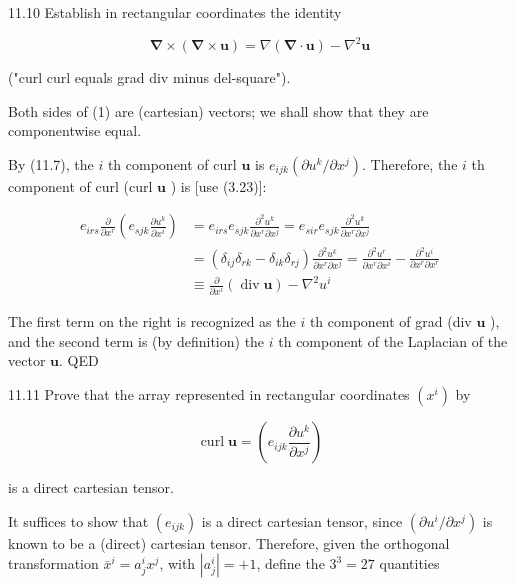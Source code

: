 \documentclass[10pt]{article}
\begin{document}
11.10 Establish in rectangular coordinates the identity


\begin{equation*}
\boldsymbol{\nabla} \times(\boldsymbol{\nabla} \times \mathbf{u})=\nabla(\boldsymbol{\nabla} \cdot \mathbf{u})-\nabla^{2} \mathbf{u} \tag{1}
\end{equation*}


("curl curl equals grad div minus del-square").

Both sides of (1) are (cartesian) vectors; we shall show that they are componentwise equal.

By (11.7), the $i$ th component of curl $\mathbf{u}$ is $e_{i j k}\left(\partial u^{k} / \partial x^{j}\right)$. Therefore, the $i$ th component of curl (curl $\mathbf{u}$ ) is [use (3.23)]:

$$
\begin{aligned}
e_{i r s} \frac{\partial}{\partial x^{r}}\left(e_{s j k} \frac{\partial u^{k}}{\partial x^{i}}\right) & =e_{i r s} e_{s j k} \frac{\partial^{2} u^{k}}{\partial x^{r} \partial x^{j}}=e_{s i r} e_{s j k} \frac{\partial^{2} u^{k}}{\partial x^{r} \partial x^{j}} \\
& =\left(\delta_{i j} \delta_{r k}-\delta_{i k} \delta_{r j}\right) \frac{\partial^{2} u^{k}}{\partial x^{r} \partial x^{j}}=\frac{\partial^{2} u^{r}}{\partial x^{r} \partial x^{i}}-\frac{\partial^{2} u^{i}}{\partial x^{r} \partial x^{r}} \\
& \equiv \frac{\partial}{\partial x^{i}}(\operatorname{div} \mathbf{u})-\nabla^{2} u^{i}
\end{aligned}
$$

The first term on the right is recognized as the $i$ th component of grad (div $\mathbf{u}$ ), and the second term is (by definition) the $i$ th component of the Laplacian of the vector $\mathbf{u}$. QED

11.11 Prove that the array represented in rectangular coordinates $\left(x^{i}\right)$ by

$$
\operatorname{curl} \mathbf{u}=\left(e_{i j k} \frac{\partial u^{k}}{\partial x^{j}}\right)
$$

is a direct cartesian tensor.

It suffices to show that $\left(e_{i j k}\right)$ is a direct cartesian tensor, since $\left(\partial u^{i} / \partial x^{j}\right)$ is known to be a (direct) cartesian tensor. Therefore, given the orthogonal transformation $\bar{x}^{i}=a_{j}^{i} x^{j}$, with $\left|a_{j}^{i}\right|=+1$, define the $3^{3}=27$ quantities
\end{document}
